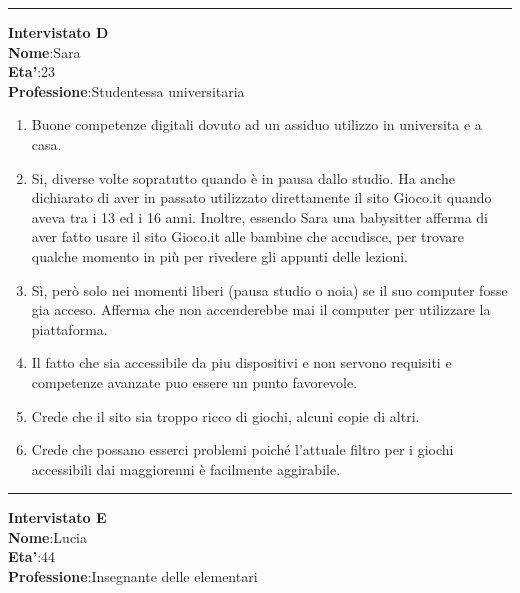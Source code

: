 \documentclass[../Report.tex]{subfiles}
\begin{document}
    \hrule
    \textbf{Intervistato D}\\

    \textbf{Nome}:Sara\\
    \textbf{Eta'}:23\\
    \textbf{Professione}:Studentessa universitaria

    \begin{enumerate}
        \item Buone competenze digitali dovuto ad un assiduo utilizzo in universita e a casa.
        \item Si, diverse volte sopratutto quando è in pausa dallo studio. Ha anche dichiarato di aver in passato utilizzato direttamente il sito Gioco.it quando aveva tra i 13 ed i 16 anni. Inoltre, essendo Sara una babysitter afferma di aver fatto usare il sito Gioco.it alle bambine che accudisce, per trovare qualche momento in più per rivedere gli appunti delle lezioni. 
        \item Sì, però solo nei momenti liberi (pausa studio o noia) se il suo computer fosse gia acceso. Afferma che  non accenderebbe mai il computer per utilizzare la piattaforma.
        \item Il fatto che sia accessibile da piu dispositivi e non servono requisiti e competenze avanzate puo essere un punto favorevole.
        \item Crede che il sito sia troppo ricco di giochi, alcuni copie di altri. 
        \item Crede che possano esserci problemi poiché l'attuale filtro per i giochi accessibili dai maggiorenni è facilmente aggirabile.
        
    \end{enumerate}

    \hrule
    \textbf{Intervistato E}\\

    \textbf{Nome}:Lucia\\
    \textbf{Eta'}:44\\
    \textbf{Professione}:Insegnante delle elementari
\end{document}
